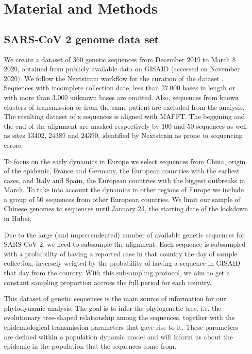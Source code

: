 \chapter{Material and Methods}

\section{SARS-CoV 2 genome data set}

We create a dataset of 360 genetic sequences from December 2019 to March 8 2020, obtained from publicly available data on GISAID \cite{GISAID} (accessed on November 2020). We follow the Nextstrain workflow for the curation of the dataset \cite{nextstrain}. Sequences with incomplete collection date, less than 27.000 bases in length or with more than 3.000 unknown bases are omitted. Also, sequences from known clusters of transmission or from the same patient are excluded from the analysis. The resulting dataset of x  sequences is aligned with MAFFT. The beggining and the end of the alignment are masked respectively by 100 and 50 sequences as well as sites  13402, 24389 and 24390, identified by Nextstrain as prone to sequencing errors.

To focus on the early dynamics in Europe we select sequences from China, origin of the epidemic, France and Germany, the European countries with the earliest cases, and Italy and Spain, the European countries with the biggest outbreaks in March. To take into account the dynamics in other regions of Europe we include a group of 50 sequences from other European countries. We limit our sample of Chinese genomes to sequences until January 23, the starting date of the lockdown in Hubei. 

Due to the large (and unprecendented) number of available genetic sequences for SARS-CoV-2, we need to subsample the alignment. Each sequence is subsampled with a probability of having a reported case in that country the day of sample collection, inversely weigted by the probability of having a sequence in GISAID that day from the country. With this subsampling protocol, we aim to get a constant sampling proportion accross the full period for each country. 

This dataset of genetic sequences is the main source of information for our phylodynamic analysis. The goal is to infer the phylogenetic tree, i.e. the evolutionary tree-shaped relationship among the sequences, together with the epidemiological transmission parameters that gave rise to it. These parameters are defined within a population dynamic model and will inform us about the epidemic in the population that the sequences come from.

